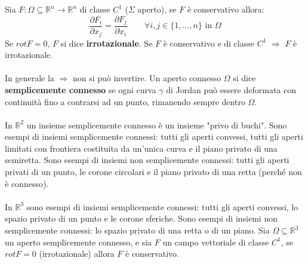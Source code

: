 	\thh
	Sia $F: \Omega \subseteq \mathbb{R}^n \rightarrow \mathbb{R}^n$ di classe $C^1$ ($\Sigma$ aperto), se $F$ è conservativo allora:
	$$\frac{\partial F_i}{\partial x_j} = \frac{\partial F_j}{\partial x_i} \qquad \forall i, j \in \{ 1,\dots, n\} \text{ in } \Omega$$
	Se $rotF=0$, $F$ si dice \textbf{irrotazionale}.
	\prop
	Se $F$ è conservativo e di classe $C^1$ $\Rightarrow$ $F$ è irrotazionale.\\
	\\
	In generale la $\Rightarrow$ non si può invertire.
	Un aperto connesso $\Omega$ si dice \textbf{semplicemente connesso} se ogni curva $\gamma$ di Jordan può essere deformata con continuità fino a contrarsi ad un punto, rimanendo sempre dentro $\Omega$.\\
	\\
	In $\mathbb{R}^2$ un insieme semplicemente connesso è un insieme "privo di buchi". Sono esempi di insiemi semplicemente connessi: tutti gli aperti convessi, tutti gli aperti limitati con frontiera costituita da un'unica curva e il piano privato di una semiretta. Sono esempi di insiemi non semplicemente connessi: tutti gli aperti privati di un punto, le corone circolari e il piano privato di una retta (perché non è connesso).\\
	\\
	In $\mathbb{R}^3$ sono esempi di insiemi semplicemente connessi: tutti gli aperti convessi, lo spazio privato di un punto e le corone sferiche. Sono esempi di insiemi non semplicemente connessi: lo spazio privato di una retta o di un piano.
	\thh
	Sia $\Omega \subseteq \mathbb{R}^3$ un aperto semplicemente connesso, e sia $F$ un campo
	vettoriale di classe $C^1 $, se $rotF=0$ (irrotazionale) allora $F$ è conservativo.
